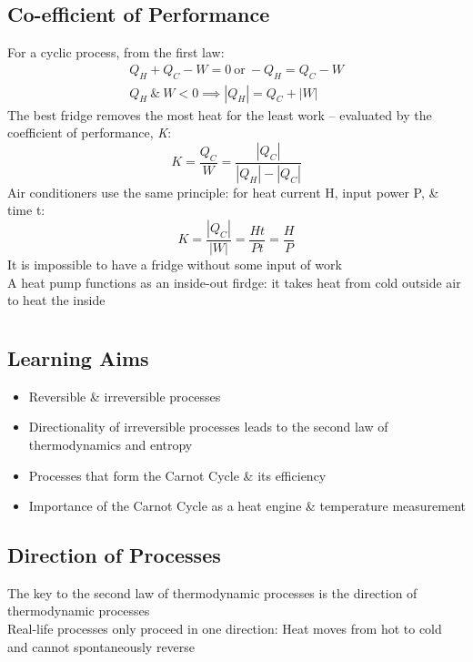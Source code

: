 \documentclass[a4paper, 11pt, fleqn, normalem]{report}
\begin{document}
\section*{Co-efficient of Performance}
For a cyclic process, from the first law:
\begin{gather*}
	Q_{H} + Q_{C} - W = 0 ~\text{or}~ -Q_{H} = Q_{C} - W \\
	Q_{H} ~\&~ W < 0 \implies |Q_{H}| = Q_{C} + |W|
\end{gather*}
The best fridge removes the most heat for the least work -- evaluated by the coefficient of performance, \emph{K}:
\begin{equation*}
	K = \frac{Q_{C}}{W} = \frac{|Q_{C}|}{|Q_{H}| - |Q_{C}|}
\end{equation*}
Air conditioners use the same principle: for heat current H, input power P, \& time t:
\begin{equation*}
	K = \frac{|Q_{C}|}{|W|} = \frac{Ht}{Pt} = \frac{H}{P}
\end{equation*}
It is impossible to have a fridge without some input of work \\
A heat pump functions as an inside-out firdge: it takes heat from cold outside air to heat the inside

\chapter{}
\section*{Learning Aims}
\begin{itemize}
	\item Reversible \& irreversible processes
	\item Directionality of irreversible processes leads to the second law of thermodynamics and entropy
	\item Processes that form the Carnot Cycle \& its efficiency
	\item Importance of the Carnot Cycle as a heat engine \& temperature measurement
\end{itemize}

\section*{Direction of Processes}
The key to the second law of thermodynamic processes is the direction of thermodynamic processes \\
Real-life processes only proceed in one direction: Heat moves from hot to cold and cannot spontaneously reverse
\end{document}
